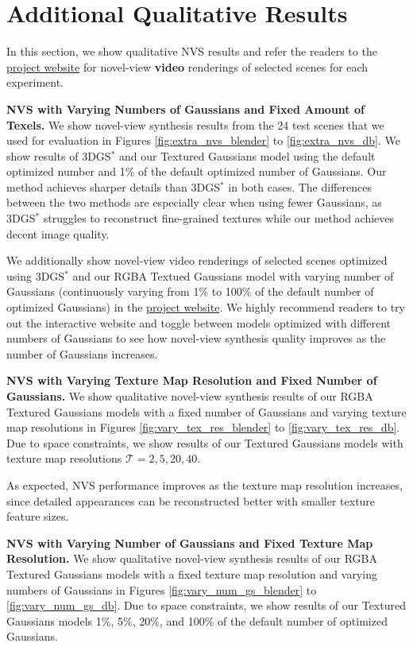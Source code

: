 \section{Additional Qualitative Results} 
In this section, we show qualitative NVS results and refer the readers to the \href{https://textured-gaussians.github.io/}{project website} for novel-view \textbf{video} renderings of selected scenes for each experiment. 

\noindent \textbf{NVS with Varying Numbers of Gaussians and Fixed Amount of Texels. } We show novel-view synthesis results from the 24 test scenes that we used for evaluation in Figures \ref{fig:extra_nvs_blender} to \ref{fig:extra_nvs_db}. We show results of 3DGS$^*$ and our Textured Gaussians model using the default optimized number and 1\% of the default optimized number of Gaussians. Our method achieves sharper details than 3DGS$^*$ in both cases. The differences between the two methods are especially clear when using fewer Gaussians, as 3DGS$^*$ struggles to reconstruct fine-grained textures while our method achieves decent image quality.

We additionally show novel-view video renderings of selected scenes optimized using 3DGS$^*$ and our RGBA Textued Gaussians model with varying number of Gaussians (continuously varying from 1\% to 100\% of the default number of optimized Gaussians) in the \href{https://textured-gaussians.github.io/}{project website}. We highly recommend readers to try out the interactive website and toggle between models optimized with different numbers of Gaussians to see how novel-view synthesis quality improves as the number of Gaussians increases.

\noindent \textbf{NVS with Varying Texture Map Resolution and Fixed Number of Gaussians. } We show qualitative novel-view synthesis results of our RGBA Textured Gaussians models with a fixed number of Gaussians and varying texture map resolutions in Figures \ref{fig:vary_tex_res_blender} to \ref{fig:vary_tex_res_db}. Due to space constraints, we show results of our Textured Gaussians models with texture map resolutions $\mathcal{T} = 2, 5, 20, 40$.

As expected, NVS performance improves as the texture map resolution increases, since detailed appearances can be reconstructed better with smaller texture feature sizes.

\noindent \textbf{NVS with Varying Number of Gaussians and Fixed Texture Map Resolution. } We show qualitative novel-view synthesis results of our RGBA Textured Gaussians models with a fixed texture map resolution and varying numbers of Gaussians in Figures \ref{fig:vary_num_gs_blender} to \ref{fig:vary_num_gs_db}. Due to space constraints, we show results of our Textured Gaussians models 1\%, 5\%, 20\%, and 100\% of the default number of optimized Gaussians.

